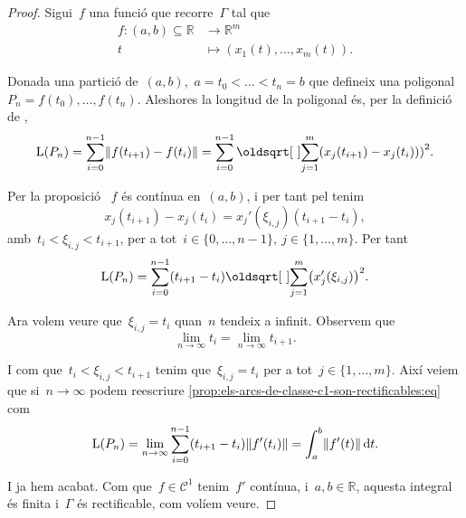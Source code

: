 \documentclass[../calcul-en-diverses-variables.tex]{subfiles}
\begin{document}
    \begin{proof}
        Sigui~\(f\) una funció que recorre~\(\Gamma\) tal que
        \begin{align*}
        f\colon(a,b)\subseteq\mathbb{R}&\longrightarrow\mathbb{R}^{m}\\
        t&\longmapsto(x_{1}(t),\dots,x_{m}(t)).
        \end{align*}

        Donada una partició de~\((a,b)\),~\(a=t_{0}<\dots<t_{n}=b\) que defineix una poligonal~\(P_{n}=f(t_{0}),\dots,f(t_{n})\).
        Aleshores la longitud de la poligonal  és, per la definició de ,
        \[
            \Long(P_n)=\sum_{i=0}^{n-1}\norm{f(t_{i+1})-f(t_{i})}=\sum_{i=0}^{n-1}\sqrt{\sum_{j=1}^{m}\left(x_{j}(t_{i+1})-x_{j}(t_{i}))\right)^{2}}.
        \]

        Per la proposició ~\(f\) és contínua en~\((a,b)\), i per tant pel  tenim
        \[
            x_{j}(t_{i+1})-x_{j}(t_{i})=x_{j}'(\xi_{i,j})(t_{i+1}-t_{i}),
        \]
        amb~\(t_{i}<\xi_{i,j}<t_{i+1}\), per a tot~\(i\in\{0,\dots,n-1\},\ j\in\{1,\dots,m\}\).
        Per tant
        \begin{equation}\label{prop:els-arcs-de-classe-c1-son-rectificables:eq}
        \Long(P_{n})=\sum_{i=0}^{n-1}(t_{i+1}-t_{i})\sqrt{\sum_{j=1}^{m}\left(x_{j}'(\xi_{i,j})\right)^2}.
        \end{equation}

        Ara volem veure que~\(\xi_{i,j}=t_{i}\) quan~\(n\) tendeix a infinit.
        Observem que
        \[
            \lim_{n\to\infty}t_{i}=\lim_{n\to\infty}t_{i+1}.
        \]

        I com que~\(t_{i}<\xi_{i,j}<t_{i+1}\) tenim que~\(\xi_{i,j}=t_{i}\) per a tot~\(j\in\{1,\dots,m\}\).
        Així veiem que si~\(n\to\infty\) podem reescriure \eqref{prop:els-arcs-de-classe-c1-son-rectificables:eq} com
        \begin{displaymath}
        \Long(P_{n})=\lim_{n\to\infty}\sum_{i=0}^{n-1}(t_{i+1}-t_{i})\norm{f'(t_{i})}=\int_{a}^{b}\norm{f'(t)}\diff t.
        \end{displaymath}

        I ja hem acabat.
        Com que~\(f\in\mathcal{C}^{1}\) tenim~\(f'\) contínua, i~\(a,b\in\mathbb{R}\), aquesta integral és finita i~\(\Gamma\) és rectificable, com volíem veure.
    \end{proof}
\end{document}
